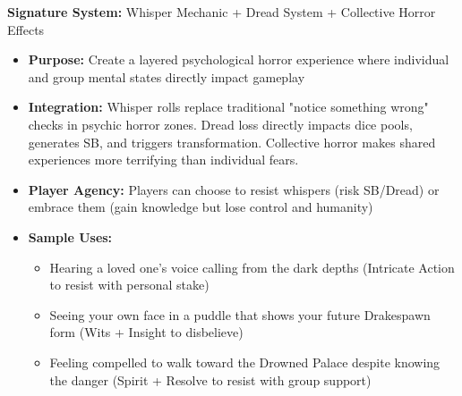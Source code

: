 \documentclass[11pt]{article}
\begin{document}
\textbf{Signature System:} Whisper Mechanic + Dread System + Collective Horror Effects
\begin{itemize}
\item \textbf{Purpose:} Create a layered psychological horror experience where individual and group mental states directly impact gameplay
\item \textbf{Integration:} Whisper rolls replace traditional "notice something wrong" checks in psychic horror zones. Dread loss directly impacts dice pools, generates SB, and triggers transformation. Collective horror makes shared experiences more terrifying than individual fears.
\item \textbf{Player Agency:} Players can choose to resist whispers (risk SB/Dread) or embrace them (gain knowledge but lose control and humanity)
\item \textbf{Sample Uses:}
  \begin{itemize}
  \item Hearing a loved one's voice calling from the dark depths (Intricate Action to resist with personal stake)
  \item Seeing your own face in a puddle that shows your future Drakespawn form (Wits + Insight to disbelieve)
  \item Feeling compelled to walk toward the Drowned Palace despite knowing the danger (Spirit + Resolve to resist with group support)
  \end{itemize}
\end{itemize}
\end{document}

